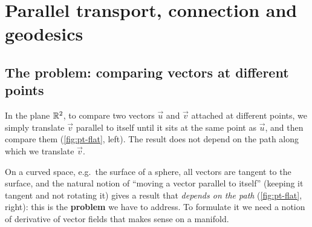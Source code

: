 \chapter{Parallel transport, connection and geodesics}\label{ch:connection}

\section{The problem: comparing vectors at different points}

In the plane $\mathbb{R}^2$, to compare two vectors $\vec u$ and $\vec v$ attached at different points, we simply translate $\vec v$ parallel to itself until it sits at the same point as $\vec u$, and then compare them (\cref{fig:pt-flat}, left). The result does not depend on the path along which we translate $\vec v$.

On a curved space, e.g.\ the surface of a sphere, all vectors are tangent to the surface, and the natural notion of ``moving a vector parallel to itself'' (keeping it tangent and not rotating it) gives a result that \emph{depends on the path} (\cref{fig:pt-flat}, right): this is the \textbf{problem} we have to address. To formulate it we need a notion of derivative of vector fields that makes sense on a manifold.

